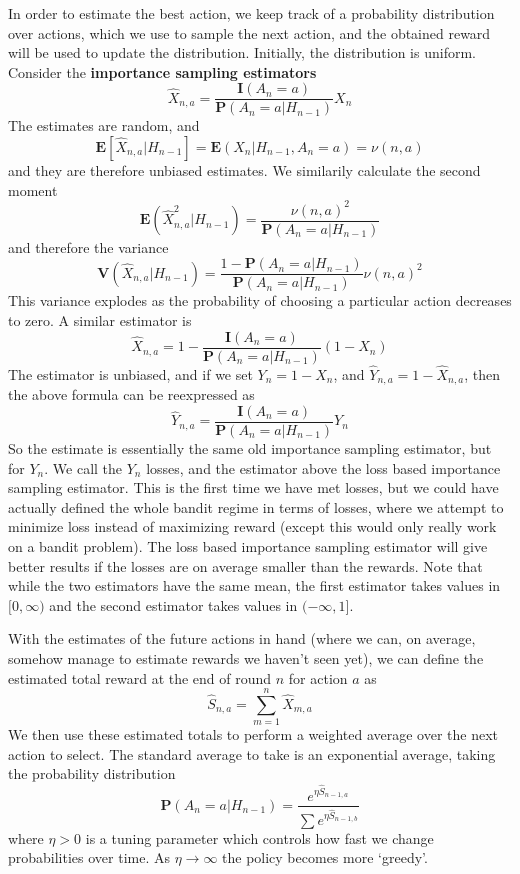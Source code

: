 In order to estimate the best action, we keep track of a probability distribution over actions, which we use to sample the next action, and the obtained reward will be used to update the distribution. Initially, the distribution is uniform. Consider the {\bf importance sampling estimators}
%
\[ \widehat{X}_{n,a} = \frac{\mathbf{I}(A_n = a)}{\mathbf{P}(A_n = a | H_{n-1})} X_n \]
%
The estimates are random, and
%
\[ \mathbf{E}[\widehat{X}_{n,a} | H_{n-1}] = \mathbf{E}(X_n | H_{n-1}, A_n = a) = \nu(n,a) \]
%
and they are therefore unbiased estimates. We similarily calculate the second moment
%
\[ \mathbf{E}(\widehat{X}_{n,a}^2 | H_{n-1}) = \frac{\nu(n,a)^2}{\mathbf{P}(A_n = a | H_{n-1})} \]
%
and therefore the variance
%
\[ \mathbf{V}(\widehat{X}_{n,a} | H_{n-1}) = \frac{1 - \mathbf{P}(A_n = a | H_{n-1})}{\mathbf{P}(A_n = a | H_{n-1})} \nu(n,a)^2 \]
%
This variance explodes as the probability of choosing a particular action decreases to zero. A similar estimator is
%
\[ \widehat{X}_{n,a} = 1 - \frac{\mathbf{I}(A_n = a)}{\mathbf{P}(A_n = a | H_{n-1})} (1 - X_n) \]
%
The estimator is unbiased, and if we set $Y_n = 1 - X_n$, and $\widehat{Y}_{n,a} = 1 - \widehat{X}_{n,a}$, then the above formula can be reexpressed as
%
\[  \widehat{Y}_{n,a} = \frac{\mathbf{I}(A_n = a)}{\mathbf{P}(A_n = a | H_{n-1})} Y_n \]
%
So the estimate is essentially the same old importance sampling estimator, but for $Y_n$. We call the $Y_n$ losses, and the estimator above the loss based importance sampling estimator. This is the first time we have met losses, but we could have actually defined the whole bandit regime in terms of losses, where we attempt to minimize loss instead of maximizing reward (except this would only really work on a bandit problem).  The loss based importance sampling estimator will give better results if the losses are on average smaller than the rewards. Note that while the two estimators have the same mean, the first estimator takes values in $[0,\infty)$ and the second estimator takes values in $(-\infty,1]$.

With the estimates of the future actions in hand (where we can, on average, somehow manage to estimate rewards we haven't seen yet), we can define the estimated total reward at the end of round $n$ for action $a$ as
%
\[ \widehat{S}_{n,a} = \sum_{m = 1}^n \widehat{X}_{m,a} \]
%
We then use these estimated totals to perform a weighted average over the next action to select. The standard average to take is an exponential average, taking the probability distribution
%
\[ \mathbf{P}(A_n = a | H_{n-1}) = \frac{e^{\eta \widehat{S}_{n-1, a}}}{\sum e^{\eta \widehat{S}_{n-1, b}}} \]
%
where $\eta > 0$ is a tuning parameter which controls how fast we change probabilities over time. As $\eta \to \infty$ the policy becomes more `greedy'.

